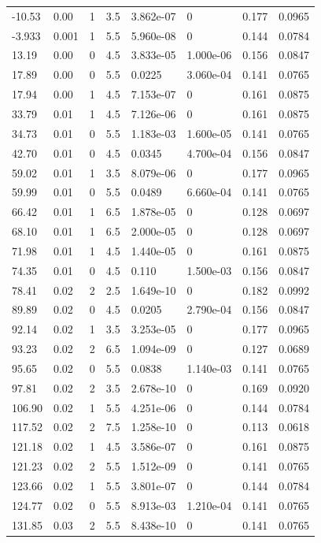 \documentclass[preview]{standalone}
\begin{document}
{{\begin{tabular}{L{1.2cm}C{1.2cm} C{0.3cm}C{0.5cm} C{1.4cm}C{1.4cm} C{1.4cm}C{1.4cm}}
  -10.53  &  0.00  & 1     & 3.5 &  3.862e-07  & 0  & 0.177 &  0.0965   \\ 
  -3.933  &  0.001  & 1     & 5.5 &  5.960e-08  & 0  & 0.144 &  0.0784   \\ 
  13.19  &  0.00  & 0     & 4.5 &  3.833e-05  & 1.000e-06  & 0.156 &  0.0847   \\ 
  17.89  &  0.00  & 0     & 5.5 &  0.0225  & 3.060e-04  & 0.141 &  0.0765   \\ 
  17.94  &  0.00  & 1     & 4.5 &  7.153e-07  & 0  & 0.161 &  0.0875   \\ 
  33.79  &  0.01  & 1     & 4.5 &  7.126e-06  & 0  & 0.161 &  0.0875   \\ 
  34.73  &  0.01  & 0     & 5.5 &  1.183e-03  & 1.600e-05  & 0.141 &  0.0765   \\ 
  42.70  &  0.01  & 0     & 4.5 &  0.0345  & 4.700e-04  & 0.156 &  0.0847   \\ 
  59.02  &  0.01  & 1     & 3.5 &  8.079e-06  & 0  & 0.177 &  0.0965   \\ 
  59.99  &  0.01  & 0     & 5.5 &  0.0489  & 6.660e-04  & 0.141 &  0.0765   \\ 
  66.42  &  0.01  & 1     & 6.5 &  1.878e-05  & 0  & 0.128 &  0.0697   \\ 
  68.10  &  0.01  & 1     & 6.5 &  2.000e-05  & 0  & 0.128 &  0.0697   \\ 
  71.98  &  0.01  & 1     & 4.5 &  1.440e-05  & 0  & 0.161 &  0.0875   \\ 
  74.35  &  0.01  & 0     & 4.5 &  0.110  & 1.500e-03  & 0.156 &  0.0847   \\ 
  78.41  &  0.02  & 2     & 2.5 &  1.649e-10  & 0  & 0.182 &  0.0992   \\ 
  89.89  &  0.02  & 0     & 4.5 &  0.0205  & 2.790e-04  & 0.156 &  0.0847   \\ 
  92.14  &  0.02  & 1     & 3.5 &  3.253e-05  & 0  & 0.177 &  0.0965   \\ 
  93.23  &  0.02  & 2     & 6.5 &  1.094e-09  & 0  & 0.127 &  0.0689   \\ 
  95.65  &  0.02  & 0     & 5.5 &  0.0838  & 1.140e-03  & 0.141 &  0.0765   \\ 
  97.81  &  0.02  & 2     & 3.5 &  2.678e-10  & 0  & 0.169 &  0.0920   \\ 
  106.90  &  0.02  & 1     & 5.5 &  4.251e-06  & 0  & 0.144 &  0.0784   \\ 
  117.52  &  0.02  & 2     & 7.5 &  1.258e-10  & 0  & 0.113 &  0.0618   \\ 
  121.18  &  0.02  & 1     & 4.5 &  3.586e-07  & 0  & 0.161 &  0.0875   \\ 
  121.23  &  0.02  & 2     & 5.5 &  1.512e-09  & 0  & 0.141 &  0.0765   \\ 
  123.66  &  0.02  & 1     & 5.5 &  3.801e-07  & 0  & 0.144 &  0.0784   \\ 
  124.77  &  0.02  & 0     & 5.5 &  8.913e-03  & 1.210e-04  & 0.141 &  0.0765   \\ 
  131.85  &  0.03  & 2     & 5.5 &  8.438e-10  & 0  & 0.141 &  0.0765   \\ 
\hline 
\end{tabular} 

}}
\end{document}
